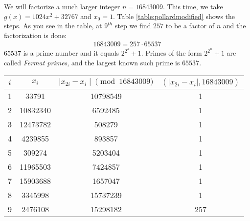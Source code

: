 \documentclass{subfiles}
\begin{document}
	\begin{example}
		We will factorize a much larger integer $n=16843009$. This time, we take $g(x)=1024x^2+32767$ and $x_0=1$. Table \ref{table:pollardmodified} shows the steps. As you see in the table, at $9^{th}$ step we find $257$ to be a factor of $n$ and the factorization is done:
			\begin{align*}
				16843009 = 257 \cdot 65537
			\end{align*}
		$65537$ is a prime number and it equals $2^{2^{4}}+1$. Primes of the form $2^{2^n}+1$ are called \textit{Fermat primes}, and the largest known such prime is $65537$.
		\begin{table}
				\centering
				\begin{tabular}{|c|c|c|c|}
					\hline
					$i$ & $x_i$ & $\mid x_{2i}-x_i\mid  \pmod{16843009}$ & $(\mid x_{2i}-x_i\mid , 16843009)$ \\
					\hline
					1 & 33791 & 10798549 & 1 \\
					\hline
					2 & 10832340 & 6592485 & 1 \\
					\hline
					3 & 12473782 & 508279 & 1 \\
					\hline
					4 & 4239855 & 893857 & 1 \\
					\hline
					5 & 309274 & 5203404 & 1 \\
					\hline
					6 & 11965503 & 7424857 & 1 \\
					\hline
					7 & 15903688 & 1657047 & 1 \\
					\hline
					8 & 3345998 & 15737239 & 1 \\
					\hline
					9 & 2476108 & 15298182 & 257 \\

\end{tabular}
\end{table}
\end{example}
\end{document}
